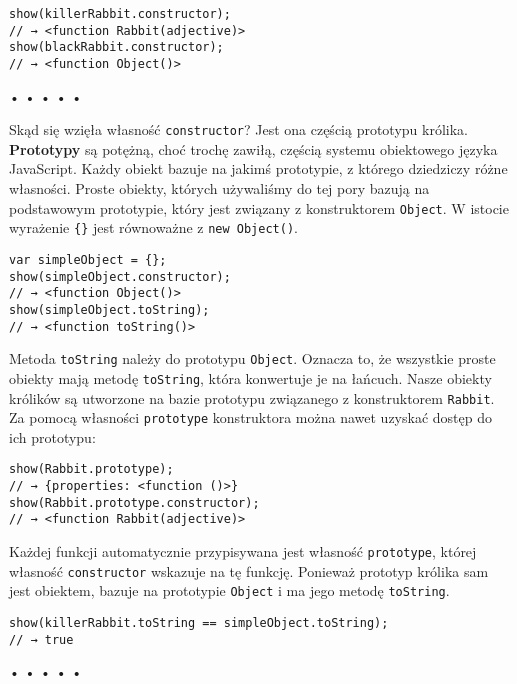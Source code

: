   
\begin{verbatim} 
show(killerRabbit.constructor);
// → <function Rabbit(adjective)>
show(blackRabbit.constructor);
// → <function Object()>
\end{verbatim}


\begin{center}
• • • • •
\end{center}

  
Skąd się wzięła własność \texttt{constructor}? Jest ona częścią prototypu królika. \textbf{Prototypy} są potężną, choć trochę zawiłą, częścią systemu obiektowego języka JavaScript. Każdy obiekt bazuje na jakimś prototypie, z którego dziedziczy różne własności. Proste obiekty, których używaliśmy do tej pory bazują na podstawowym prototypie, który jest związany z konstruktorem \texttt{Object}. W istocie wyrażenie \texttt{\{\}} jest równoważne z \texttt{new Object()}.

  
\begin{verbatim} 
var simpleObject = {};
show(simpleObject.constructor);
// → <function Object()>
show(simpleObject.toString);
// → <function toString()>
 \end{verbatim}
  
Metoda \texttt{toString} należy do prototypu \texttt{Object}. Oznacza to, że wszystkie proste obiekty mają metodę \texttt{toString}, która konwertuje je na łańcuch. Nasze obiekty królików są utworzone na bazie prototypu związanego z konstruktorem \texttt{Rabbit}. Za pomocą własności \texttt{prototype} konstruktora można nawet uzyskać dostęp do ich prototypu:

  
\begin{verbatim} 
show(Rabbit.prototype);
// → {properties: <function ()>}
show(Rabbit.prototype.constructor);
// → <function Rabbit(adjective)>
\end{verbatim}
  
Każdej funkcji automatycznie przypisywana jest własność \texttt{prototype}, której własność \texttt{constructor} wskazuje na tę funkcję. Ponieważ prototyp królika sam jest obiektem, bazuje na prototypie \texttt{Object} i ma jego metodę \texttt{toString}.

  
\begin{verbatim} 
show(killerRabbit.toString == simpleObject.toString);
// → true
\end{verbatim}


\begin{center}
• • • • •
\end{center}

